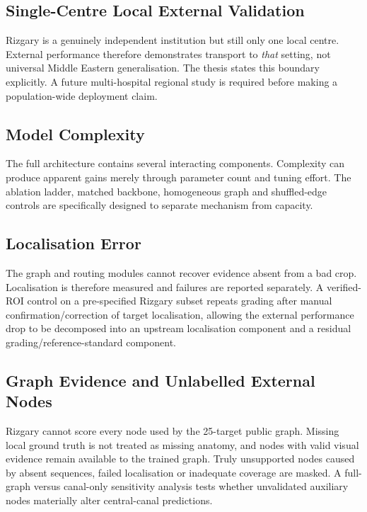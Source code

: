 \subsection{Single-Centre Local External Validation}
\label{sec:method-threat-single-centre}

Rizgary is a genuinely independent institution but still only one local centre.
External performance therefore demonstrates transport to \emph{that} setting,
not universal Middle Eastern generalisation. The thesis states this boundary
explicitly. A future multi-hospital regional study is required before making a
population-wide deployment claim.

\subsection{Model Complexity}
\label{sec:method-threat-complexity}

The full architecture contains several interacting components. Complexity can
produce apparent gains merely through parameter count and tuning effort. The
ablation ladder, matched backbone, homogeneous graph and shuffled-edge controls
are specifically designed to separate mechanism from capacity.

\subsection{Localisation Error}
\label{sec:method-threat-localisation}

The graph and routing modules cannot recover evidence absent from a bad crop.
Localisation is therefore measured and failures are reported separately. A
verified-ROI control on a pre-specified Rizgary subset repeats grading after
manual confirmation/correction of target localisation, allowing the external
performance drop to be decomposed into an upstream localisation component and a
residual grading/reference-standard component.

\subsection{Graph Evidence and Unlabelled External Nodes}
\label{sec:method-threat-graph-external}

Rizgary cannot score every node used by the 25-target public graph. Missing
local ground truth is not treated as missing anatomy, and nodes with valid
visual evidence remain available to the trained graph. Truly unsupported nodes
caused by absent sequences, failed localisation or inadequate coverage are
masked. A full-graph versus canal-only sensitivity analysis tests whether
unvalidated auxiliary nodes materially alter central-canal predictions.

